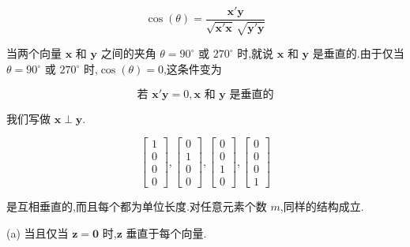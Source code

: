 \[
\cos(\theta) = \frac{\bm{x}'\bm{y}}{\sqrt{\bm{x}'\bm{x}} \, \sqrt{\bm{y}'\bm{y}}}
\]

 \quad 当两个向量 $\bm{x}$ 和 $\bm{y}$ 之间的夹角 $\theta = 90^\circ$ 或 $270^\circ$ 时,就说 $\bm{x}$ 和 $\bm{y}$ 是垂直的.由于仅当 $\theta = 90^\circ$ 或 $270^\circ$ 时,$\cos(\theta) = 0$,这条件变为

\[
\text{若 } \bm{x}'\bm{y} = 0,\bm{x} \text{ 和 } \bm{y} \text{ 是垂直的}
\]

我们写做 $\bm{x} \perp \bm{y}$.


\[
\begin{bmatrix} 1 \\ 0 \\ 0 \\ 0 \end{bmatrix},
\begin{bmatrix} 0 \\ 1 \\ 0 \\ 0 \end{bmatrix},
\begin{bmatrix} 0 \\ 0 \\ 1 \\ 0 \end{bmatrix},
\begin{bmatrix} 0 \\ 0 \\ 0 \\ 1 \end{bmatrix}
\]

是互相垂直的,而且每个都为单位长度.对任意元素个数 $m$,同样的结构成立.


(a) 当且仅当 $\bm{z} = \bm{0}$ 时,$\bm{z}$ 垂直于每个向量.
